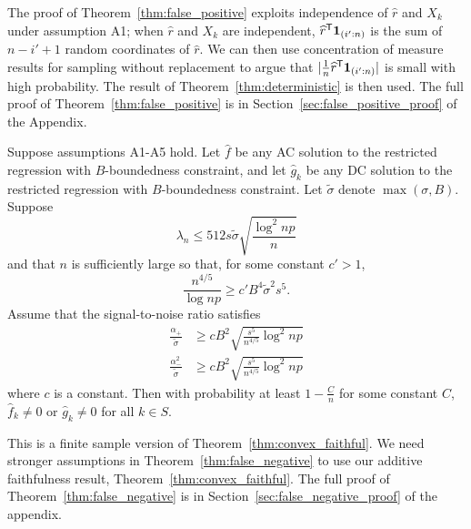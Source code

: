 The proof of Theorem~\ref{thm:false_positive} exploits independence of
$\hat{r}$ and $X_k$ under assumption A1; when $\hat{r}$ and $X_k$ are independent,
$\widehat{r}^{\mathsf{T}} \mbox{\boldmath $1$}_{(i':n)}$ is the sum of $n - i' +1$ random
coordinates of $\hat{r}$.  We can then use concentration of
measure results for sampling without replacement to argue that $|
\frac{1}{n} \widehat{r}^{\mathsf{T}}\mbox{\boldmath $1$}_{(i':n)}|$ is small with high
probability. The result of Theorem~\ref{thm:deterministic} is then
used. The full proof of Theorem~\ref{thm:false_positive} is in
Section~\ref{sec:false_positive_proof} of the Appendix.

\begin{theorem}
\label{thm:false_negative}
Suppose assumptions A1-A5 hold. Let $\hat{f}$ be any AC solution to
the restricted regression with $B$-boundedness constraint, and let
$\hat{g}_k$ be any DC solution to the restricted regression with
$B$-boundedness constraint. Let $\tilde{\sigma}$ denote $\max(\sigma,
B)$.  Suppose 
\begin{equation}
\lambda_n \leq 512 s \tilde{\sigma} \sqrt{\frac{\log^2 np}{n}}
\end{equation}
and that $n$ is sufficiently large so that, for some constant $c' > 1$,
\begin{equation}
\frac{n^{4/5}}{\log np} \geq c' B^4 \tilde{\sigma}^2 s^5.
\end{equation}
Assume that the signal-to-noise ratio satisfies
\begin{align}
\frac{\alpha_{+}}{\tilde{\sigma}} & \geq c B^2
\sqrt{\frac{s^5}{n^{4/5}} \log^2 np}\\
\frac{\alpha_{-}^2}{\tilde{\sigma}} &\geq c B^2
\sqrt{\frac{s^5}{n^{4/5}} \log^2 np}
\end{align}
where $c$ is a constant.  Then with probability at least $1 -
\frac{C}{n}$ for some constant $C$, 
$\hat{f}_k \neq 0$ or $\hat{g}_k \neq 0$ 
for all $k \in S$.
\end{theorem}

This is a finite sample version of
Theorem~\ref{thm:convex_faithful}. We need stronger assumptions in
Theorem~\ref{thm:false_negative} to use our additive faithfulness
result, Theorem~\ref{thm:convex_faithful}. The full proof of Theorem~\ref{thm:false_negative} is in Section~\ref{sec:false_negative_proof} of the appendix.

